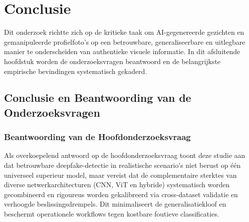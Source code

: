 
\chapter{Conclusie}%
\label{ch:conclusie}

Dit onderzoek richtte zich op de kritieke taak om AI-gegenereerde gezichten en gemanipuleerde profielfoto's op een betrouwbare, generaliseerbare en uitlegbare manier te onderscheiden van authentieke visuele informatie. In dit afsluitende hoofdstuk worden de onderzoeksvragen beantwoord en de belangrijkste empirische bevindingen systematisch gekaderd.

\section{Conclusie en Beantwoording van de Onderzoeksvragen}

\subsection{Beantwoording van de Hoofdonderzoeksvraag}
Als overkoepelend antwoord op de hoofdonderzoeksvraag toont deze studie aan dat betrouwbare deepfake-detectie in realistische scenario's niet berust op één universeel superieur model, maar vereist dat de complementaire sterktes van diverse netwerkarchitecturen (CNN, ViT en hybride) systematisch worden gecombineerd en rigoureus worden gekalibreerd via cross-dataset validatie en verhoogde beslissingsdrempels. Dit minimaliseert de generalisatiekloof en beschermt operationele workflows tegen kostbare foutieve classificaties.

